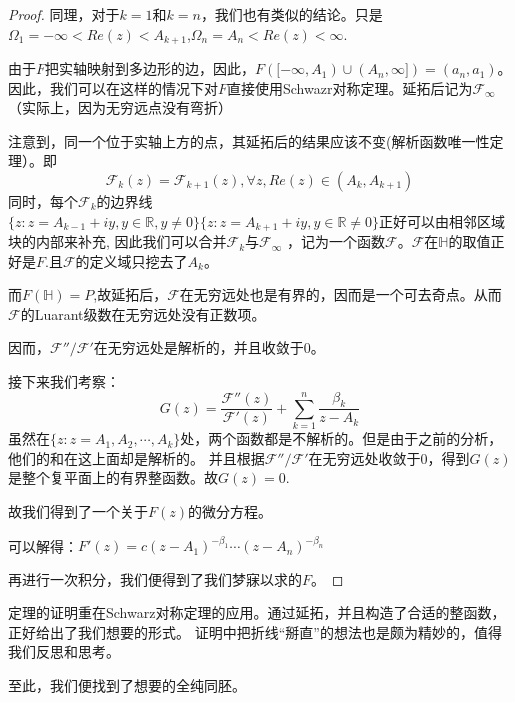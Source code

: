 \documentclass[UTF8]{ctexart}[a4paper,10pt]
\def\R{\mathbb{R}}
\def\H{\mathbb{H}}
\begin{document}
\begin{proof}
        同理，对于$k=1$和$k=n$，我们也有类似的结论。只是$\Omega_1=-\infty<Re(z)<A_{k+1}$,$\Omega_n=A_{n}<Re(z)<\infty$.

        由于$F$把实轴映射到多边形的边，因此，$F([-\infty,A_1)\cup(A_n,\infty])=(a_n,a_1)$。
        因此，我们可以在这样的情况下对$F$直接使用Schwazr对称定理。延拓后记为$\mathcal{F_\infty}$（实际上，因为无穷远点没有弯折）

        注意到，同一个位于实轴上方的点，其延拓后的结果应该不变(解析函数唯一性定理）。即
        $$
        \mathcal{F}_k(z)=\mathcal{F}_{k+1}(z),\forall z,Re(z) \in (A_k,A_{k+1})
        $$
        同时，每个$\mathcal{F}_k$的边界线$\{z:z=A_{k-1}+iy,y\in \R,y\neq 0\} \{z:z=A_{k+1}+iy,y\in \R \neq 0\}$正好可以由相邻区域块的内部来补充,
        因此我们可以合并$\mathcal{F}_k$与$\mathcal{F_\infty}$
        ，记为一个函数$\mathcal{F}$。$\mathcal{F}$在$\H$的取值正好是$F$.且$\mathcal{F}$的定义域只挖去了$A_k$。
        
        而$F(\H)=P$,故延拓后，$\mathcal{F}$在无穷远处也是有界的，因而是一个可去奇点。从而$\mathcal{F}$的Luarant级数在无穷远处没有正数项。

        因而，$\mathcal{F}''/\mathcal{F}'$在无穷远处是解析的，并且收敛于0。

        接下来我们考察：
        $$
        G(z)=\frac{\mathcal{F}''(z)}{\mathcal{F}'(z)}+\sum_{k=1}^{n}\frac{\beta_k}{z-A_k}
        $$
        虽然在$\{z:z=A_1,A_2,\cdots,A_k\}$处，两个函数都是不解析的。但是由于之前的分析，他们的和在这上面却是解析的。
        并且根据$\mathcal{F}''/\mathcal{F}'$在无穷远处收敛于0，得到$G(z)$是整个复平面上的有界整函数。故$G(z)=0$.

        故我们得到了一个关于$F(z)$的微分方程。

        可以解得：$F'(z)=c(z-A_1)^{-\beta_1}\cdots (z-A_n)^{-\beta_n}$

        再进行一次积分，我们便得到了我们梦寐以求的$F$。
        \end{proof}
   

    定理的证明重在Schwarz对称定理的应用。通过延拓，并且构造了合适的整函数，正好给出了我们想要的形式。
    证明中把折线“掰直”的想法也是颇为精妙的，值得我们反思和思考。
    \cite{2007Complex}

    
    至此，我们便找到了想要的全纯同胚。
    
    
\end{document}
